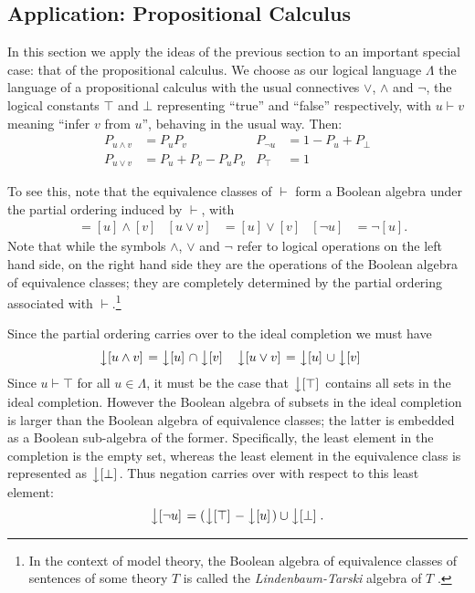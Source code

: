 \subsection{Application: Propositional Calculus}
\label{propositional}

In this section we apply the ideas of the previous section to an important special case: that of the propositional calculus. We choose as our logical language $\Lambda$ the language of a propositional calculus with the usual connectives $\lor$, $\land$ and $\lnot$, the logical constants $\top$ and $\bot$ representing ``true'' and ``false'' respectively, with $u \vdash v$ meaning ``infer $v$ from $u$'', behaving in the usual way. Then:
\begin{align*}
P_{u\land v} &= P_uP_v
	& P_{\lnot u} &= 1 - P_u + P_\bot\\
P_{u\lor v} &= P_u + P_v - P_uP_v
	& P_{\top} &=1
\end{align*}

To see this, note that the equivalence classes of $\vdash$ form a Boolean algebra under the partial ordering induced by $\vdash$, with
\begin{align*}
[u\land v] & = [u] \land [v]
 & [u\lor v] & = [u] \lor [v]
  & [\lnot u] & = \lnot[u].
\end{align*}
Note that while the symbols $\land$, $\lor$ and $\lnot$ refer to logical operations on the left hand side, on the right hand side they are the operations of the Boolean algebra of equivalence classes; they are completely determined by the partial ordering associated with $\vdash$.\footnote{In the context of model theory, the Boolean algebra of equivalence classes of sentences of some theory $T$ is called the \emph{Lindenbaum-Tarski} algebra of $T$ \citep{Hinman:05}.}

Since the partial ordering carries over to the ideal completion we must have
\begin{align*}
\left\downarrow[u\land v]\right. &= \left\downarrow[u]\right. \cap \left\downarrow[v]\right.
& \left\downarrow[u\lor v]\right. &= \left\downarrow[u]\right. \cup \left\downarrow[v]\right.
\end{align*}
Since $u \vdash \top$ for all $u\in \Lambda$, it must be the case that $\left\downarrow[\top]\right.$ contains all sets in the ideal completion. However the Boolean algebra of subsets in the ideal completion is larger than the Boolean algebra of equivalence classes; the latter is embedded as a Boolean sub-algebra of the former. Specifically, the least element in the completion is the empty set, whereas the least element in the equivalence class is represented as $\left\downarrow[\bot]\right.$. Thus negation carries over with respect to this least element:
$$\left\downarrow[\lnot u]\right. = (\left\downarrow[\top]\right. - \left\downarrow[u]\right.)\cup \left\downarrow[\bot]\right..$$

